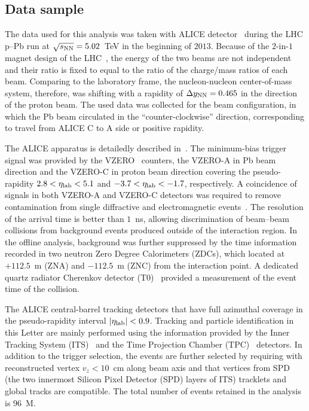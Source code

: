 \subsection{Data sample}
\label{sec:EveSel}

The data used for this analysis was taken with ALICE detector~\cite{Abelev:2014ffa} during the LHC p--Pb run at $\sqrt{s_{\rm NN}}=5.02$~TeV in the beginning of $2013$.
Because of the $2$-in-$1$ magnet design of the LHC~\cite{Evans:2008zzb}, the energy of the two beams are not independent and their ratio is fixed to equal to the ratio of the charge/mass ratios of each beam.
Comparing to the laboratory frame, the nucleon-nucleon center-of-mass system, therefore, was shifting with a rapidity of $\Delta y_{\rm NN}=0.465$ in the direction of the proton beam.
The used data was collected for the beam configuration, in which the Pb beam circulated in the ``counter-clockwise'' direction, corresponding to travel from ALICE C to A side or positive rapidity.

The ALICE apparatus is detailedly described in~\cite{Aamodt:2008zz}.
The minimum-bias trigger signal was provided by the VZERO~\cite{Abbas:2013taa} counters, the VZERO-A in Pb beam direction and the VZERO-C in proton beam direction covering the pseudo-rapidity $2.8<\eta_{\rm lab}<5.1$ and $-3.7<\eta_{\rm lab}<-1.7$, respectively.
A coincidence of signals in both VZERO-A and VZERO-C detectors was required to remove contamination from single diffractive and electromagnetic events~\cite{ALICE:2012xs}.
The resolution of the arrival time is better than $1$~ns, allowing discrimination of beam--beam collisions from background events produced outside of the interaction region.
In the offline analysis, background was further suppressed by the time information recorded in two neutron Zero Degree Calorimeters (ZDCs), which located at $+112.5$~m (ZNA) and $-112.5$~m (ZNC) from the interaction point.
A dedicated quartz radiator Cherenkov detector (T0)~\cite{Akindinov:2013tea} provided a measurement of the event time of the collision.

The ALICE central-barrel tracking detectors that have full azimuthal coverage in the pseudo-rapidity interval $|\eta_{\rm lab}|<0.9$.
Tracking and particle identification in this Letter are mainly performed using the information provided by the Inner Tracking System (ITS)~\cite{Aamodt:2010aa} and the Time Projection Chamber (TPC)~\cite{Alme:2010ke} detectors.
In addition to the trigger selection, the events are further selected by requiring with reconstructed vertex $v_{z}<10$~cm along beam axis and that vertices from SPD (the two innermost Silicon Pixel Detector (SPD) layers of ITS) tracklets and global tracks are compatible.
The total number of events retained in the analysis is 96~M.